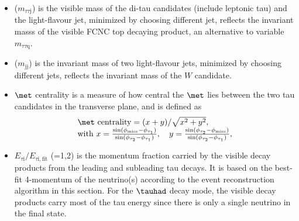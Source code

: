 \documentclass[PAPER, coverpage, atlasdraft=true, texlive=2016, UKenglish]{\ATLASLATEXPATH atlasdoc} %
\begin{document}
\begin{itemize}
\item {}($m_{\tau\tau \text{j}}$) is the visible mass of the di-tau candidates (include leptonic tau) and the light-flavour jet, minimized by choosing different jet, reflects the invariant masss of the visible FCNC top decaying product, an alternative to variable $m_{\tau\tau\text{q}}$.
\item {}($m_{\text{jj}}$) is the invariant mass of two light-flavour jets, minimized by choosing different jets, reflects the invariant mass of the $W$ candidate.
\item $\met$ centrality is a measure of how central the $\met$ lies between the two tau candidates in the transverse plane, and is defined as
\begin{eqnarray}
\begin{array}{l}
\met~\text{centrality} = {(x+y)}/{\sqrt{x^2+y^2}}, \\
\text{with}~x=\frac{\sin(\phi_{\text{miss}}-\phi_{\tau_1})}{\sin(\phi_{\tau_2}-\phi_{\tau_1})}, \quad  y=\frac{\sin(\phi_{\tau_2}-\phi_{\text{miss}})}{\sin(\phi_{\tau_2}-\phi_{\tau_1})} ,
\end{array}
\label{eq:eq3}
\end{eqnarray}
\item $E_{\tau\text{i}}/E_{\tau\text{i},\text{fit}}$ (=1,2) is the momentum fraction carried by the visible decay products from the leading and subleading tau decays. It is based on the best-fit 4-momentum of the neutrino(s) according to the event reconstruction algorithm in this section. For the $\tauhad$ decay mode, the visible decay products carry most of the tau energy since there is only a single neutrino in the final state.%

\end{itemize}
\end{document}

